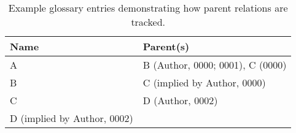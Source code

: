     \begin{table}[hbtp!]
        \centering
        \begin{tabular}{ll} \hline
            Name                        & Parent(s)                        \\ \hline
            A                           & B (Author, 0000; 0001), C (0000) \\
            B                           & C (implied by Author, 0000)      \\
            C                           & D (Author, 0002)                 \\
            D (implied by Author, 0002) &                                  \\ \hline
        \end{tabular}
        \caption{Example glossary entries demonstrating how parent relations are tracked.}
        \label{tab:exampleGlossary}
    \end{table}

    \ExampleGraph{}

